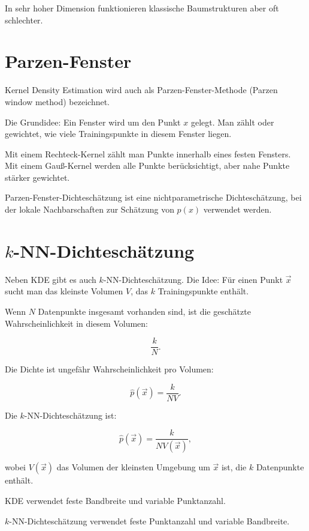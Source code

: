In sehr hoher Dimension funktionieren klassische Baumstrukturen aber oft schlechter.

\section{Parzen-Fenster}

Kernel Density Estimation wird auch als Parzen-Fenster-Methode (Parzen window method) bezeichnet.

Die Grundidee:
Ein Fenster wird um den Punkt \(x\) gelegt.
Man zählt oder gewichtet, wie viele Trainingspunkte in diesem Fenster liegen.

Mit einem Rechteck-Kernel zählt man Punkte innerhalb eines festen Fensters.
Mit einem Gauß-Kernel werden alle Punkte berücksichtigt, aber nahe Punkte stärker gewichtet.

\begin{definitionbox}
Parzen-Fenster-Dichteschätzung ist eine nichtparametrische Dichteschätzung, bei der lokale Nachbarschaften zur Schätzung von \(p(x)\) verwendet werden.
\end{definitionbox}

\section{\(k\)-NN-Dichteschätzung}

Neben KDE gibt es auch \(k\)-NN-Dichteschätzung.
Die Idee:
Für einen Punkt \(\vec{x}\) sucht man das kleinste Volumen \(V\), das \(k\) Trainingspunkte enthält.

Wenn \(N\) Datenpunkte insgesamt vorhanden sind, ist die geschätzte Wahrscheinlichkeit in diesem Volumen:

\[
    \frac{k}{N}.
\]

Die Dichte ist ungefähr Wahrscheinlichkeit pro Volumen:

\[
    \hat{p}(\vec{x})
    =
    \frac{k}{NV}.
\]

\begin{definitionbox}
Die \(k\)-NN-Dichteschätzung ist:

\[
    \hat{p}(\vec{x})
    =
    \frac{k}{N V(\vec{x})},
\]

wobei \(V(\vec{x})\) das Volumen der kleinsten Umgebung um \(\vec{x}\) ist, die \(k\) Datenpunkte enthält.
\end{definitionbox}

\begin{conceptbox}
KDE verwendet feste Bandbreite und variable Punktanzahl.

\(k\)-NN-Dichteschätzung verwendet feste Punktanzahl und variable Bandbreite.
\end{conceptbox}


